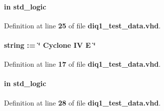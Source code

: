 \paragraph[{ddr\+\_\+en}]{ {\bfseries \textcolor{keywordflow}{in}\textcolor{vhdlchar}{ }} {\bfseries \textcolor{comment}{std\+\_\+logic}\textcolor{vhdlchar}{ }} \hspace{0.3cm}{\ttfamily [Port]}}\label{classdiq1__test__data_adbfe05e6692f69f8e592df06c6055f0a}


Definition at line {\bf 25} of file {\bf diq1\+\_\+test\+\_\+data.\+vhd}.

\paragraph[{dev\+\_\+family}]{ {\bfseries \textcolor{vhdlchar}{ }} {\bfseries \textcolor{comment}{string}\textcolor{vhdlchar}{ }\textcolor{vhdlchar}{ }\textcolor{vhdlchar}{\+:}\textcolor{vhdlchar}{=}\textcolor{vhdlchar}{ }\textcolor{vhdlchar}{ }\textcolor{vhdlchar}{ }\textcolor{vhdlchar}{ }\textcolor{keyword}{\char`\"{} Cyclone I\+V E \char`\"{}}\textcolor{vhdlchar}{ }} \hspace{0.3cm}{\ttfamily [Generic]}}\label{classdiq1__test__data_a1314572919959082d23e5f98e64a0ce2}


Definition at line {\bf 17} of file {\bf diq1\+\_\+test\+\_\+data.\+vhd}.

\paragraph[{fidm}]{ {\bfseries \textcolor{keywordflow}{in}\textcolor{vhdlchar}{ }} {\bfseries \textcolor{comment}{std\+\_\+logic}\textcolor{vhdlchar}{ }} \hspace{0.3cm}{\ttfamily [Port]}}\label{classdiq1__test__data_a97ae5ad9eee26d5f984f95d151f62ec0}


Definition at line {\bf 28} of file {\bf diq1\+\_\+test\+\_\+data.\+vhd}.

